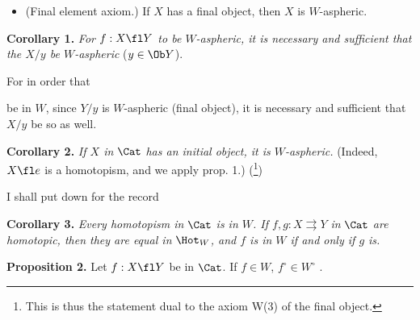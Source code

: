 \begin{itemize}[leftmargin=*]
\item[\textbf{W(3)}] (Final element axiom.) If $X$ has a final object, then $X$ is $W$-aspheric.
\end{itemize}

\textbf{Corollary 1.} \textit{For $f : X \fl Y$ to be $W$-aspheric, it is necessary and sufficient that the $X/y$ be $W$-aspheric} ($y \in \Ob Y$).

For in order that
be in $W$, since $Y/y$ is $W$-aspheric (final object), it is necessary and sufficient that $X/y$ be so as well.

\textbf{Corollary 2.} \textit{If $X$ in} $\Cat$ \textit{has an initial object, it is $W$-aspheric.} (Indeed, $X \fl e$ is a homotopism, and we apply prop. 1.) (\footnote{This is thus the statement dual to the axiom W(3) of the final object.})

I shall put down for the record

\textbf{Corollary 3.} \textit{Every homotopism in} $\Cat$ \textit{is in $W$. If $f, g : X \rightrightarrows Y$ in} $\Cat$ \textit{are homotopic, then they are equal in} $\Hot_W$\textit{, and $f$ is in $W$ if and only if $g$ is.}

\textbf{Proposition 2.} Let $f : X \fl Y$ be in $\Cat$. If $f \in W$, $f^\circ \in W^\circ$ .